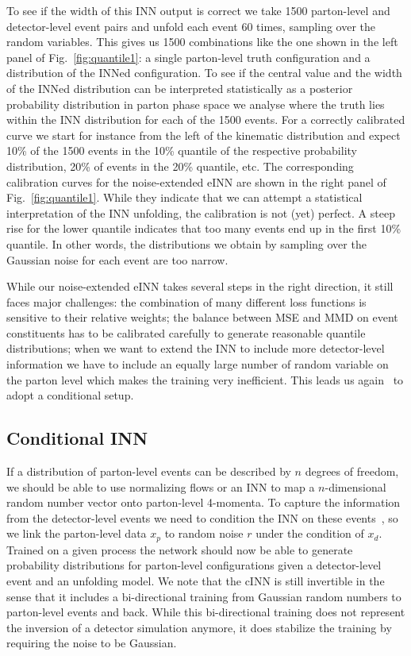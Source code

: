 To see if the width of this INN output is correct we take 1500
parton-level and detector-level event pairs and unfold each event 60
times, sampling over the random variables. This gives us 1500
combinations like the one shown in the left panel of
Fig.~\ref{fig:quantile1}: a single parton-level truth configuration
and a distribution of the INNed configuration. To see if the central
value and the width of the INNed distribution can be interpreted
statistically as a posterior probability distribution in parton phase
space we analyse where the truth lies within the INN distribution for
each of the 1500 events.  For a correctly calibrated curve we start
for instance from the left of the kinematic distribution and expect
10\% of the 1500 events in the 10\% quantile of the respective
probability distribution, 20\% of events in the 20\% quantile, etc.
The corresponding calibration curves for the noise-extended eINN are
shown in the right panel of Fig.~\ref{fig:quantile1}. While they
indicate that we can attempt a statistical interpretation of the INN
unfolding, the calibration is not (yet) perfect.  A steep rise for the
lower quantile indicates that too many events end up in the first 10\%
quantile. In other words, the distributions we obtain by sampling over
the Gaussian noise for each event are too narrow.

While our noise-extended eINN takes several steps in the right
direction, it still faces major challenges: the combination of many
different loss functions is sensitive to their relative weights; the
balance between MSE and MMD on event constituents has to be calibrated
carefully to generate reasonable quantile distributions; when we want
to extend the INN to include more detector-level information we have
to include an equally large number of random variable on the parton
level which makes the training very inefficient. This leads us
again~\cite{fcgan} to adopt a conditional setup.

\subsection{Conditional INN}
\label{sec:inn_cond}

If a distribution of parton-level events can be described by $n$
degrees of freedom, we should be able to use normalizing flows or an
INN to map a $n$-dimensional random number vector onto parton-level
4-momenta.  To capture the information from the detector-level events
we need to condition the INN on these
events~\cite{goodfellow,cond_gan,fcgan}, so we link the parton-level
data $x_p$ to random noise $r$ under the condition of $x_d$. Trained
on a given process the network should now be able to generate
probability distributions for parton-level configurations given a
detector-level event and an unfolding model. We note that the cINN
is still invertible in the sense that it includes a bi-directional
training from Gaussian random numbers to parton-level events and
back. While this bi-directional training does not represent the
inversion of a detector simulation anymore, it does stabilize the
training by requiring the noise to be Gaussian.

